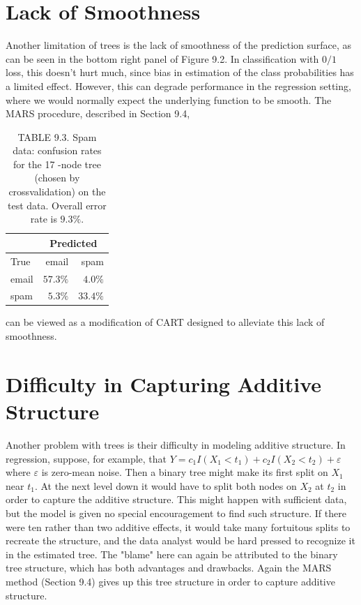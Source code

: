 \documentclass[10pt]{article}
\begin{document}
\section*{Lack of Smoothness}
Another limitation of trees is the lack of smoothness of the prediction surface, as can be seen in the bottom right panel of Figure 9.2. In classification with $0 / 1$ loss, this doesn't hurt much, since bias in estimation of the class probabilities has a limited effect. However, this can degrade performance in the regression setting, where we would normally expect the underlying function to be smooth. The MARS procedure, described in Section 9.4,

\begin{table}[h]
\begin{center}
\captionsetup{labelformat=empty}
\caption{TABLE 9.3. Spam data: confusion rates for the 17 -node tree (chosen by crossvalidation) on the test data. Overall error rate is $9.3 \%$.}
\begin{tabular}{l|rr}
 & \multicolumn{2}{|c}{Predicted} \\
\hline
True & email & spam \\
\hline
email & $57.3 \%$ & $4.0 \%$ \\
spam & $5.3 \%$ & $33.4 \%$ \\
\hline
\end{tabular}
\end{center}
\end{table}

can be viewed as a modification of CART designed to alleviate this lack of smoothness.

\section*{Difficulty in Capturing Additive Structure}
Another problem with trees is their difficulty in modeling additive structure. In regression, suppose, for example, that $Y=c_{1} I\left(X_{1}<t_{1}\right)+c_{2} I\left(X_{2}<\right. \left.t_{2}\right)+\varepsilon$ where $\varepsilon$ is zero-mean noise. Then a binary tree might make its first split on $X_{1}$ near $t_{1}$. At the next level down it would have to split both nodes on $X_{2}$ at $t_{2}$ in order to capture the additive structure. This might happen with sufficient data, but the model is given no special encouragement to find such structure. If there were ten rather than two additive effects, it would take many fortuitous splits to recreate the structure, and the data analyst would be hard pressed to recognize it in the estimated tree. The "blame" here can again be attributed to the binary tree structure, which has both advantages and drawbacks. Again the MARS method (Section 9.4) gives up this tree structure in order to capture additive structure.
\end{document}
